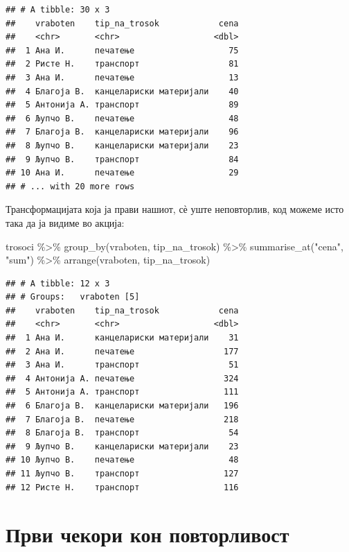 \documentclass[
]{book}
\newenvironment{Shaded}{\begin{snugshade}}{\end{snugshade}}
\newcommand{\FunctionTok}[1]{\textcolor[rgb]{0.00,0.00,0.00}{#1}}
\newcommand{\NormalTok}[1]{#1}
\newcommand{\SpecialCharTok}[1]{\textcolor[rgb]{0.00,0.00,0.00}{#1}}
\newcommand{\StringTok}[1]{\textcolor[rgb]{0.31,0.60,0.02}{#1}}
\begin{document}
\begin{verbatim}
## # A tibble: 30 x 3
##    vraboten    tip_na_trosok            cena
##    <chr>       <chr>                   <dbl>
##  1 Ана И.      печатење                   75
##  2 Ристе Н.    транспорт                  81
##  3 Ана И.      печатење                   13
##  4 Благоја В.  канцелариски материјали    40
##  5 Антонија А. транспорт                  89
##  6 Љупчо В.    печатење                   48
##  7 Благоја В.  канцелариски материјали    96
##  8 Љупчо В.    канцелариски материјали    23
##  9 Љупчо В.    транспорт                  84
## 10 Ана И.      печатење                   29
## # ... with 20 more rows
\end{verbatim}

Трансформацијата која ја прави нашиот, сѐ уште неповторлив, код можеме исто така да ја видиме во акција:

\begin{Shaded}
\begin{Highlighting}[]
\NormalTok{trosoci }\SpecialCharTok{\%\textgreater{}\%} 
  \FunctionTok{group\_by}\NormalTok{(vraboten, tip\_na\_trosok) }\SpecialCharTok{\%\textgreater{}\%} 
  \FunctionTok{summarise\_at}\NormalTok{(}\StringTok{"cena"}\NormalTok{, }\StringTok{"sum"}\NormalTok{) }\SpecialCharTok{\%\textgreater{}\%} 
  \FunctionTok{arrange}\NormalTok{(vraboten, tip\_na\_trosok)}
\end{Highlighting}
\end{Shaded}

\begin{verbatim}
## # A tibble: 12 x 3
## # Groups:   vraboten [5]
##    vraboten    tip_na_trosok            cena
##    <chr>       <chr>                   <dbl>
##  1 Ана И.      канцелариски материјали    31
##  2 Ана И.      печатење                  177
##  3 Ана И.      транспорт                  51
##  4 Антонија А. печатење                  324
##  5 Антонија А. транспорт                 111
##  6 Благоја В.  канцелариски материјали   196
##  7 Благоја В.  печатење                  218
##  8 Благоја В.  транспорт                  54
##  9 Љупчо В.    канцелариски материјали    23
## 10 Љупчо В.    печатење                   48
## 11 Љупчо В.    транспорт                 127
## 12 Ристе Н.    транспорт                 116
\end{verbatim}

\hypertarget{ux43fux440ux432ux438-ux447ux435ux43aux43eux440ux438-ux43aux43eux43d-ux43fux43eux432ux442ux43eux440ux43bux438ux432ux43eux441ux442}{%
\section{Први чекори кон повторливост}\label{ux43fux440ux432ux438-ux447ux435ux43aux43eux440ux438-ux43aux43eux43d-ux43fux43eux432ux442ux43eux440ux43bux438ux432ux43eux441ux442}}
\end{document}
